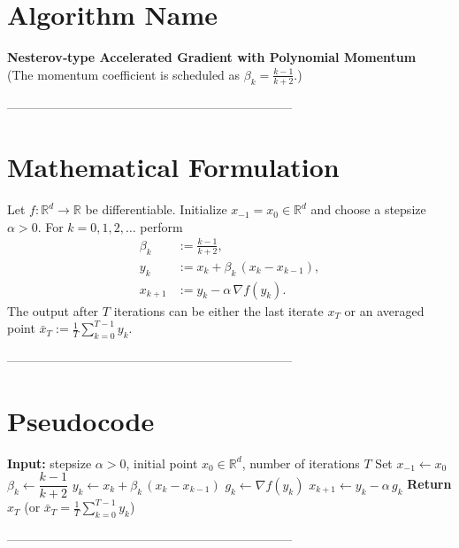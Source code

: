 \documentclass{article}
\newcommand{\grad}{\nabla}
\begin{document}
\section*{Algorithm Name}
\textbf{Nesterov‑type Accelerated Gradient with Polynomial Momentum}\\
(The momentum coefficient is scheduled as $\displaystyle \beta_k=\frac{k-1}{k+2}$.)

---------------------------------------------------------------------

\section*{Mathematical Formulation}
Let $f:\mathbb{R}^d\rightarrow\mathbb{R}$ be differentiable.  
Initialize $x_{-1}=x_{0}\in\mathbb{R}^d$ and choose a stepsize $\alpha>0$.  
For $k=0,1,2,\dots$ perform
\begin{align}
    \beta_k &:=\frac{k-1}{k+2}, \tag{1}\\[4pt]
    y_k    &:= x_k+\beta_k\,(x_k-x_{k-1}), \tag{2}\\[4pt]
    x_{k+1}&:= y_k-\alpha\,\grad f(y_k). \tag{3}
\end{align}
The output after $T$ iterations can be either the last iterate $x_T$ or an
averaged point $\bar x_T:=\frac1T\sum_{k=0}^{T-1}y_k$.

---------------------------------------------------------------------

\section*{Pseudocode}
\begin{algorithm}[H]
\caption{Accelerated Gradient with Polynomial Momentum}
\begin{algorithmic}[1]
\State \textbf{Input:} stepsize $\alpha>0$, initial point $x_0\in\mathbb{R}^d$, number of iterations $T$
\State Set $x_{-1}\gets x_0$
    \State $\beta_k \gets \dfrac{k-1}{k+2}$ \hfill{}
    \State $y_k \gets x_k+\beta_k\,(x_k-x_{k-1})$ \hfill{}
    \State $g_k \gets \grad f(y_k)$ \hfill{}
    \State $x_{k+1} \gets y_k-\alpha\,g_k$ \hfill{}
\EndFor
\State \textbf{Return} $x_T$ (or $\bar x_T=\frac1T\sum_{k=0}^{T-1}y_k$)
\end{algorithmic}
\end{algorithm}

---------------------------------------------------------------------
\end{document}
